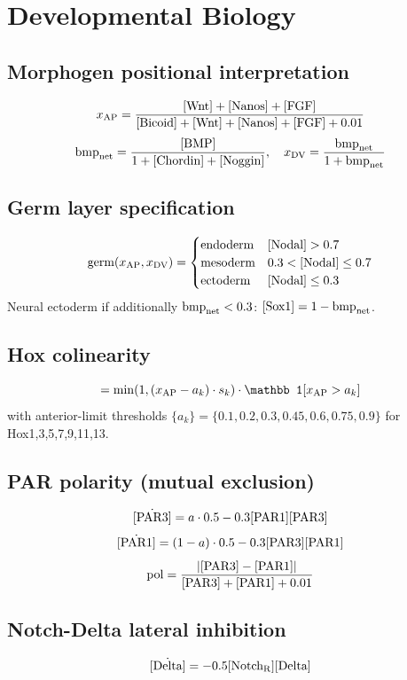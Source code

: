 \documentclass[11pt,a4paper]{article}
\newcommand{\eq}[1]{\begin{equation}#1\end{equation}}
\begin{document}
\clearpage
\section{Developmental Biology}
\label{sec:devo}

\subsection{Morphogen positional interpretation}
\eq{ x_{\rm AP} = \frac{[\rm Wnt]+[\rm Nanos]+[\rm FGF]}{[\rm Bicoid]+[\rm Wnt]+[\rm Nanos]+[\rm FGF]+0.01} }
\eq{ \mathrm{bmp}_{\rm net}=\frac{[\rm BMP]}{1+[\rm Chordin]+[\rm Noggin]},\quad x_{\rm DV}=\frac{\mathrm{bmp}_{\rm net}}{1+\mathrm{bmp}_{\rm net}} }

\subsection{Germ layer specification}
\[
\text{germ}(x_{\rm AP},x_{\rm DV})=\begin{cases}
\text{endoderm} & [\rm Nodal]>0.7\\
\text{mesoderm} & 0.3<[\rm Nodal]\le 0.7\\
\text{ectoderm} & [\rm Nodal]\le 0.3
\end{cases}
\]
Neural ectoderm if additionally $\mathrm{bmp}_{\rm net}<0.3$: $[\rm Sox1]=1-\mathrm{bmp}_{\rm net}$.

\subsection{Hox colinearity}
\eq{ [\rm Hox_k] = \min\!\left(1, (x_{\rm AP}-a_k)\cdot s_k\right)\cdot\mathbb 1[x_{\rm AP}>a_k] }
with anterior-limit thresholds $\{a_k\}=\{0.1, 0.2, 0.3, 0.45, 0.6, 0.75, 0.9\}$ for Hox1,3,5,7,9,11,13.

\subsection{PAR polarity (mutual exclusion)}
\eq{ \dot{[\rm PAR3]} = a\cdot 0.5 - 0.3[\rm PAR1][\rm PAR3] }
\eq{ \dot{[\rm PAR1]} = (1-a)\cdot 0.5 - 0.3[\rm PAR3][\rm PAR1] }
\eq{ \mathrm{pol}=\frac{|[\rm PAR3]-[\rm PAR1]|}{[\rm PAR3]+[\rm PAR1]+0.01} }

\subsection{Notch-Delta lateral inhibition}
\eq{ \dot{[\rm Delta]} = -0.5[\rm Notch_R][\rm Delta] }
\end{document}
